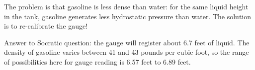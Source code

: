 
The problem is that gasoline is less dense than water: for the same liquid height in the tank, gasoline generates less hydrostatic pressure than water.  The solution is to re-calibrate the gauge!

\vskip 10pt

Answer to Socratic question: the gauge will register about 6.7 feet of liquid.  The density of gasoline varies between 41 and 43 pounds per cubic foot, so the range of possibilities here for gauge reading is 6.57 feet to 6.89 feet.











